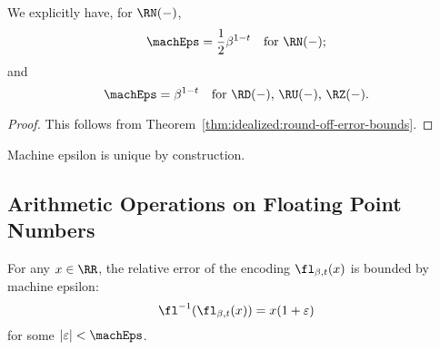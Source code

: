 \begin{thm}
  We explicitly have, for $\RN(-)$,  
  \begin{equation*}
    \machEps = \frac{1}{2}\beta^{1-t}\quad\mbox{for $\RN(-)$};
  \end{equation*}
  and
  \begin{equation*}
    \machEps = \beta^{1-t}\quad\mbox{for $\RD(-)$, $\RU(-)$, $\RZ(-)$}.
  \end{equation*}
\end{thm}
\begin{proof}
  This follows from Theorem~\ref{thm:idealized:round-off-error-bounds}.
\end{proof}

\begin{rmk}
Machine epsilon is unique by construction.
\end{rmk}

\subsection{Arithmetic Operations on Floating Point Numbers}

\begin{prop}
For any $x\in\RR$, the relative error of the encoding $\fl_{\beta,t}(x)$
is bounded by machine epsilon:
\begin{equation}
  \fl^{-1}(\fl_{\beta,t}(x)) = x(1 + \varepsilon)
\end{equation}
for some $|\varepsilon|<\machEps$.
\end{prop}

